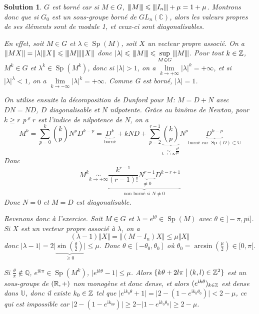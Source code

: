 \documentclass[12pt]{article}
\newtheorem{solution}{Solution}[section]
\theoremstyle{remark}
\newcommand{\C}{\mathbb{C}} \newcommand{\Q}{\mathbb{Q}}
\newcommand{\U}{\mathbb{U}} \newcommand{\E}{\mathbb{E}}
\DeclareMathOperator{\Sp}{Sp} \DeclareMathOperator{\mat}{mat}
\newcommand{\vertiii}[1]{{\left\vert\kern-0.25ex\left\vert\kern-0.25ex\left\vert{}#1
\right\vert\kern-0.25ex\right\vert\kern-0.25ex\right\vert}}
\numberwithin{equation}{section}
\begin{document}
\begin{solution}
	$G$ est borné car si $M\in G$, $\vertiii{M}\leqslant \vertiii{I_{n}}+\mu=1+\mu$. Montrons donc que si $G_{0}$ est un sous-groupe borné de $GL_{n}(\C)$, alors les valeurs propres de ses éléments sont de module 1, et ceux-ci sont diagonalisables.

	En effet, soit $M\in G$ et $\lambda\in\Sp(M)$, soit $X$ un vecteur propre associé. On a 
	$\Vert MX\Vert=\vert\lambda\vert\Vert X\Vert\leqslant\vertiii{M}\Vert X\Vert$ donc $\vert\lambda\vert\leqslant\vertiii{M}\leqslant\sup\limits_{M\in G}\vertiii{M}$. Pour tout $k\in\mathbb{Z}$, $M^{k}\in G$ et $\lambda^{k}\in\Sp(M^{k})$, donc si $\vert\lambda\vert>1$, on a $\lim\limits_{k\to+\infty}\vert\lambda\vert^{k}=+\infty$, et si $\vert\lambda\vert^{\lambda}<1$, on a $\lim\limits_{k\to-\infty}\vert\lambda\vert^{k}=+\infty$. Comme 
	G est borné, $\vert\lambda\vert=1$.

	On utilise ensuite la décomposition de Dunford pour $M$: $M=D+N$ avec $DN=ND$, $D$ diagonalisable et $N$ nilpotente. Grâce au binôme de Newton, pour $k\geqslant r$ p* $r$ est l'indice de nilpotence de $N$, on a
	$$M^{k}=\sum_{p=0}^{k}\binom{k}{p}N^{p}D^{k-p}=\underbrace{D^{k}}_{\text{borné}}+kND+\sum_{p=2}^{r-1}\underbrace{\binom{k}{p}}_{\underset{k\to+\infty}{\sim}\frac{k^{p}}{p!}}N^{p}\underbrace{D^{k-p}}_{\text{borné car }\Sp(D)\subset\U}$$
	Donc
	$$M^{k}\underset{k\to+\infty}{\sim}\underbrace{\frac{k^{r-1}}{(r-1)!}\underbrace{N^{r-1}}_{\neq0}D^{k-r+1}}_{\text{non borné si }N\neq0}$$
	Donc $N=0$ et $M=D$ est diagonalisable.

	Revenons donc à l'exercice. Soit $M\in G$ et $\lambda=e^{\mathrm{i}\theta}\in\Sp(M)$ avec $\theta\in]-\pi,pi]$. Si $X$ est un vecteur propre associé à $\lambda$, on a 
	$$(\lambda-1)\Vert X\Vert=\Vert(M-I_{n})X\Vert\leqslant\mu\Vert X\Vert$$
	donc $\vert\lambda-1\vert=2\vert\underbrace{\sin(\frac{\theta}{2})}_{\geqslant0}\vert\leqslant\mu$.
	Donc $\theta\in[-\theta_{0},\theta_{0}]$ où $\theta_{0}=\arcsin(\frac{\mu}{2})\in[0,\pi[$.

	Si $\frac{\theta}{\pi}\notin\Q$, $e^{\mathrm{i}k\pi}\in\Sp(M^{k})$, $\vert e^{\mathrm{i}k\theta}-1\vert\leqslant\mu$. Alors $\{k\theta+2l\pi\bigm| (k,l)\in\mathbb{Z}^{2}\}$ est un sous-groupe de $(\mathbb{R},+)$ non monogène et donc dense, et alors $(e^{\mathrm{i}k\theta})_{k\in\mathbb{Z}}$ est dense dans $\U$, donc il existe $k_{0}\in\mathbb{Z}$ tel que $\vert e^{\mathrm{i}k_{0}\theta}+1\vert=\vert 2-(1-e^{\mathrm{i}k_{0}\theta_{0}})\vert<2-\mu$, ce qui est impossible car $\vert 2-(1-e^{\mathrm{i}k_{0\theta}})\vert\geqslant2-\vert 1-e^{\mathrm{i}k_{0}\theta_{0}}\vert\geqslant2-\mu$.


\end{solution}
\end{document}
